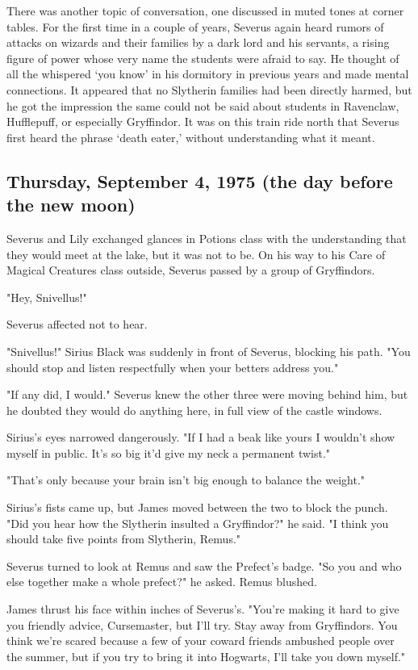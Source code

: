 There was another topic of conversation, one discussed in muted tones at corner tables. For the first time in a couple of years, Severus again heard rumors of attacks on wizards and their families by a dark lord and his servants, a rising figure of power whose very name the students were afraid to say. He thought of all the whispered `you know' in his dormitory in previous years and made mental connections. It appeared that no Slytherin families had been directly harmed, but he got the impression the same could not be said about students in Ravenclaw, Hufflepuff, or especially Gryffindor. It was on this train ride north that Severus first heard the phrase `death eater,' without understanding what it meant.

\subsection{Thursday, September 4, 1975 (the day before the new moon)}

Severus and Lily exchanged glances in Potions class with the understanding that they would meet at the lake, but it was not to be. On his way to his Care of Magical Creatures class outside, Severus passed by a group of Gryffindors.

"Hey, Snivellus!"

Severus affected not to hear.

"Snivellus!" Sirius Black was suddenly in front of Severus, blocking his path. "You should stop and listen respectfully when your betters address you."

"If any did, I would." Severus knew the other three were moving behind him, but he doubted they would do anything here, in full view of the castle windows.

Sirius's eyes narrowed dangerously. "If I had a beak like yours I wouldn't show myself in public. It's so big it'd give my neck a permanent twist."

"That's only because your brain isn't big enough to balance the weight."

Sirius's fists came up, but James moved between the two to block the punch. "Did you hear how the Slytherin insulted a Gryffindor?" he said. "I think you should take five points from Slytherin, Remus."

Severus turned to look at Remus and saw the Prefect's badge. "So you and who else together make a whole prefect?" he asked. Remus blushed.

James thrust his face within inches of Severus's. "You're making it hard to give you friendly advice, Cursemaster, but I'll try. Stay away from Gryffindors. You think we're scared because a few of your coward friends ambushed people over the summer, but if you try to bring it into Hogwarts, I'll take you down myself."

